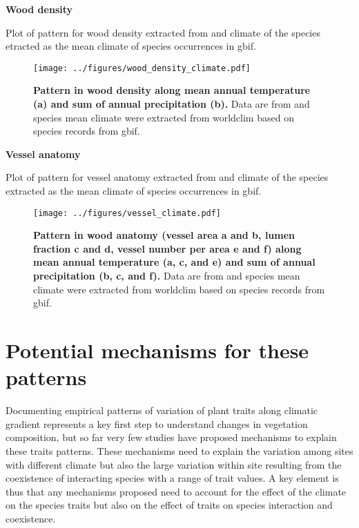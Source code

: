 \documentclass[a4paper,11pt]{article}
\begin{document}
\textbf{Wood density}

Plot of pattern for wood density extracted from \citep{Chave-2009} and climate of the species etracted as the mean climate of species occurrences in gbif.


\begin{figure}[ht]
\centering
\texttt{[image: ../figures/wood\_density\_climate.pdf]}
\caption{\textbf{Pattern in wood density along mean annual temperature (a) and sum of annual precipitation (b).}
Data are from \citep{Chave-2009} and species mean climate were extracted from worldclim based on species records from gbif.
\label{fig:WDpattern}}
\end{figure}

\textbf{Vessel anatomy}

Plot of pattern for vessel anatomy extracted from \citep{Zanne-2010} and climate of the species extracted as the mean climate of species occurrences in gbif.

\begin{figure}[ht]
\centering
\texttt{[image: ../figures/vessel\_climate.pdf]}
\caption{\textbf{Pattern in wood anatomy (vessel area a and b, lumen fraction c and d, vessel number per area e and f) along mean annual temperature (a, c, and e) and sum of annual precipitation (b, c, and f).}
Data are from \citep{Zanne-2010} and species mean climate were extracted from worldclim based on species records from gbif.
\label{fig:vesselpattern}}
\end{figure}

\clearpage

\section{Potential mechanisms for these patterns}

Documenting empirical patterns of variation of plant traits along climatic gradient represents a key first step to understand changes in vegetation composition, but so far very few studies have proposed mechanisms to explain these traits patterns. These mechanisms need to explain the variation among sites with different climate but also the large variation within site resulting from the coexistence of interacting species with a range of trait values. A key element is thus that any mechanisms proposed need to account for the effect of the climate on the species traits but also on the effect of traits on species interaction and coexistence.
\end{document}
